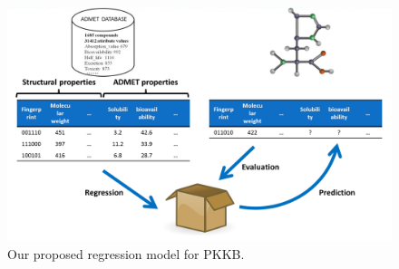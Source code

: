 \begin{figure}
\centering
\includegraphics[width=\linewidth]{PKKB/Regression.png}
\caption{Our proposed regression model for PKKB.}
\label{PKKB:Regression}
\end{figure}

\chapterend
